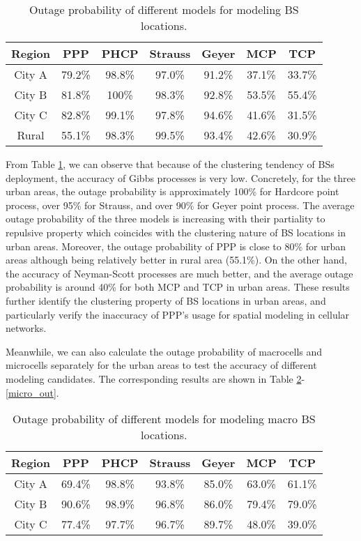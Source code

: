 \begin{table}[htbp]
  \centering
  \caption{Outage probability of different models for modeling BS locations.}
    \begin{tabular}{ccccccc}
    \toprule
    Region & PPP  & PHCP & Strauss & Geyer & MCP & TCP\\
    \midrule
    City A & 79.2\% & 98.8\% & 97.0\% & 91.2\% & 37.1\%  & 33.7\% \\
    City B & 81.8\% & 100\%  & 98.3\%   & 92.8\% & 53.5\%  & 55.4\% \\
    City C & 82.8\% & 99.1\% & 97.8\%  & 94.6\% & 41.6\%  & 31.5\% \\
    Rural  & 55.1\% &  98.3\% & 99.5\% & 93.4\% & 42.6\%  & 30.9\% \\
    \bottomrule
    \end{tabular}%
  \label{both_out}%
\end{table}%
From Table \ref{both_out}, we can observe that because of the clustering tendency of BSs deployment, the accuracy of Gibbs processes is very low. Concretely, for the three urban areas, the outage probability is approximately 100\% for Hardcore point process, over 95\% for Strauss, and over 90\% for Geyer point process. The average outage probability of the three models is increasing with their partiality to repulsive property which coincides with the clustering nature of BS locations in urban areas. Moreover, the outage probability of PPP is close to 80\% for urban areas although being relatively better in rural area (55.1\%). On the other hand, the accuracy of Neyman-Scott processes are much better, and the average outage probability is around 40\% for both MCP and TCP in urban areas. These results further identify the clustering property of BS locations in urban areas, and particularly verify the inaccuracy of PPP's usage for spatial modeling in cellular networks.

Meanwhile, we can also calculate the outage probability of macrocells and microcells separately for the urban areas to test the accuracy of different modeling candidates. The corresponding results are shown in Table \ref{macro_out}-\ref{micro_out}.

\begin{table}[htbp]
  \centering
  \caption{Outage probability of different models for modeling macro BS locations.}
    \begin{tabular}{ccccccc}
    \toprule
    Region & PPP  & PHCP & Strauss & Geyer & MCP & TCP\\
    \midrule
    City A & 69.4\% & 98.8\% & 93.8\% & 85.0\% & 63.0\%  & 61.1\% \\
    City B & 90.6\% & 98.9\%  & 96.8\%   & 86.0\% & 79.4\%  & 79.0\% \\
    City C & 77.4\% & 97.7\% & 96.7\%  & 89.7\% & 48.0\%  & 39.0\% \\
    \bottomrule
    \end{tabular}%
  \label{macro_out}%
\end{table}%

